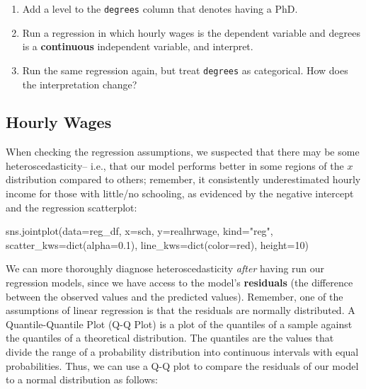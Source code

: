 \documentclass[
  letterpaper,
  DIV=11,
  numbers=noendperiod]{scrreprt}
\newenvironment{Shaded}{\begin{snugshade}}{\end{snugshade}}
\newcommand{\BuiltInTok}[1]{\textcolor[rgb]{0.00,0.23,0.31}{#1}}
\newcommand{\DecValTok}[1]{\textcolor[rgb]{0.68,0.00,0.00}{#1}}
\newcommand{\FloatTok}[1]{\textcolor[rgb]{0.68,0.00,0.00}{#1}}
\newcommand{\NormalTok}[1]{\textcolor[rgb]{0.00,0.23,0.31}{#1}}
\newcommand{\OperatorTok}[1]{\textcolor[rgb]{0.37,0.37,0.37}{#1}}
\newcommand{\StringTok}[1]{\textcolor[rgb]{0.13,0.47,0.30}{#1}}
\providecommand{\tightlist}{%
  \setlength{\itemsep}{0pt}\setlength{\parskip}{0pt}}\usepackage{longtable,booktabs,array}
\begin{document}
\begin{enumerate}
\def\labelenumi{\arabic{enumi}.}
\tightlist
\item
  Add a level to the \texttt{degrees} column that denotes having a PhD.
\item
  Run a regression in which hourly wages is the dependent variable and
  degrees is a \textbf{continuous} independent variable, and interpret.
\item
  Run the same regression again, but treat \texttt{degrees} as
  categorical. How does the interpretation change?
\end{enumerate}

\hypertarget{hourly-wages}{%
\subsection{Hourly Wages}\label{hourly-wages}}

When checking the regression assumptions, we suspected that there may be
some heteroscedasticity-- i.e., that our model performs better in some
regions of the \(x\) distribution compared to others; remember, it
consistently underestimated hourly income for those with little/no
schooling, as evidenced by the negative intercept and the regression
scatterplot:

\begin{Shaded}
\begin{Highlighting}[]
\NormalTok{sns.jointplot(data}\OperatorTok{=}\NormalTok{reg\_df, x}\OperatorTok{=}\StringTok{\textquotesingle{}sch\textquotesingle{}}\NormalTok{, y}\OperatorTok{=}\StringTok{\textquotesingle{}realhrwage\textquotesingle{}}\NormalTok{, kind}\OperatorTok{=}\StringTok{"reg"}\NormalTok{,  scatter\_kws}\OperatorTok{=}\BuiltInTok{dict}\NormalTok{(alpha}\OperatorTok{=}\FloatTok{0.1}\NormalTok{), line\_kws}\OperatorTok{=}\BuiltInTok{dict}\NormalTok{(color}\OperatorTok{=}\StringTok{\textquotesingle{}red\textquotesingle{}}\NormalTok{), height}\OperatorTok{=}\DecValTok{10}\NormalTok{)}
\end{Highlighting}
\end{Shaded}

We can more thoroughly diagnose heteroscedasticity \emph{after} having
run our regression models, since we have access to the model's
\textbf{residuals} (the difference between the observed values and the
predicted values). Remember, one of the assumptions of linear regression
is that the residuals are normally distributed. A Quantile-Quantile Plot
(Q-Q Plot) is a plot of the quantiles of a sample against the quantiles
of a theoretical distribution. The quantiles are the values that divide
the range of a probability distribution into continuous intervals with
equal probabilities. Thus, we can use a Q-Q plot to compare the
residuals of our model to a normal distribution as follows:
\end{document}
